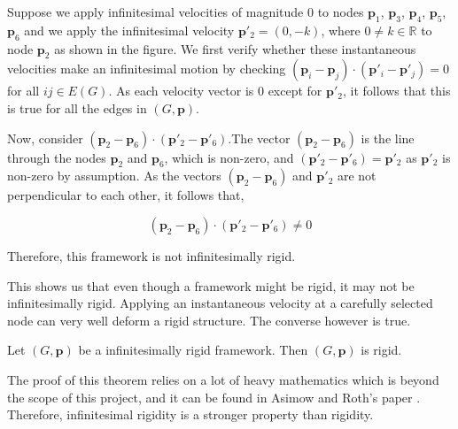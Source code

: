 \begin{flushleft}
Suppose we apply infinitesimal velocities of magnitude $0$ to nodes $\mathbf{p}_1$, $\mathbf{p}_3$, $\mathbf{p}_4$, $\mathbf{p}_5$, $\mathbf{p}_6$ and we apply the infinitesimal velocity $\mathbf{p}'_2 = (0,-k)$, where $0 \neq k \in \mathbb{R}$ to node $\mathbf{p}_2$ as shown in the figure. We first verify whether these instantaneous velocities make an infinitesimal motion by checking $(\mathbf{p}_i - \mathbf{p}_j) \cdot (\mathbf{p}'_i - \mathbf{p}'_j) = 0$ for all $ij \in E(G)$. As each velocity vector is $0$ except for $\mathbf{p}'_2$, it follows that this is true for all the edges in $(G,\mathbf{p})$.
\end{flushleft}

\begin{flushleft}
Now, consider $(\mathbf{p}_2 - \mathbf{p}_6) \cdot (\mathbf{p}'_2 - \mathbf{p}'_6)$.The vector $(\mathbf{p}_2 - \mathbf{p}_6)$ is the line through the nodes $\textbf{p}_2$ and $\textbf{p}_6$, which is non-zero, and $(\mathbf{p}'_2 - \mathbf{p}'_6) = \mathbf{p}'_2$ as $\mathbf{p}'_2$ is non-zero by assumption. As the vectors $(\mathbf{p}_2 - \mathbf{p}_6)$ and $\mathbf{p}'_2$ are not perpendicular to each other, it follows that,

\[
(\mathbf{p}_2 - \mathbf{p}_6) \cdot (\mathbf{p}'_2 - \mathbf{p}'_6) \neq 0
\]
\end{flushleft}

\begin{flushleft}
Therefore, this framework is not infinitesimally rigid. 
\end{flushleft}

\begin{flushleft}
This shows us that even though a framework might be rigid, it may not be infinitesimally rigid. Applying an instantaneous velocity at a carefully selected node can very well deform a rigid structure. The converse however is true.
\end{flushleft}

\begin{theorem}
Let $(G,\mathbf{p})$ be a infinitesimally rigid framework. Then $(G,\mathbf{p})$ is rigid.
\end{theorem}

\begin{flushleft}
The proof of this theorem relies on a lot of heavy mathematics which is beyond the scope of this project, and it can be found in Asimow and Roth's paper \cite{asimow}. Therefore, infinitesimal rigidity is a stronger property than rigidity. 
\end{flushleft}

